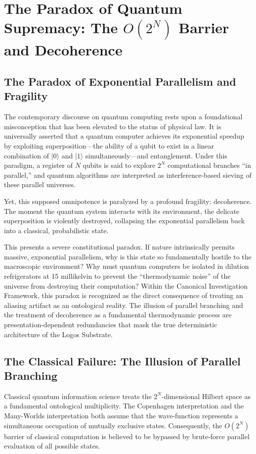 \documentclass[12pt,twoside]{extbook}
\theoremstyle{definition}
\theoremstyle{remark}
\begin{document}
\chapter{The Paradox of Quantum Supremacy: The $O(2^N)$ Barrier and Decoherence}

\section{The Paradox of Exponential Parallelism and Fragility}
The contemporary discourse on quantum computing rests upon a foundational misconception that has been elevated to the status of physical law. It is universally asserted that a quantum computer achieves its exponential speedup by exploiting superposition—the ability of a qubit to exist in a linear combination of $|0\rangle$ and $|1\rangle$ simultaneously—and entanglement. Under this paradigm, a register of $N$ qubits is said to explore $2^N$ computational branches ``in parallel,'' and quantum algorithms are interpreted as interference-based sieving of these parallel universes. 

Yet, this supposed omnipotence is paralyzed by a profound fragility: decoherence. The moment the quantum system interacts with its environment, the delicate superposition is violently destroyed, collapsing the exponential parallelism back into a classical, probabilistic state. 

This presents a severe constitutional paradox. If nature intrinsically permits massive, exponential parallelism, why is this state so fundamentally hostile to the macroscopic environment? Why must quantum computers be isolated in dilution refrigerators at 15 millikelvin to prevent the ``thermodynamic noise'' of the universe from destroying their computation? Within the Canonical Investigation Framework, this paradox is recognized as the direct consequence of treating an aliasing artifact as an ontological reality. The illusion of parallel branching and the treatment of decoherence as a fundamental thermodynamic process are presentation-dependent redundancies that mask the true deterministic architecture of the Logos Substrate.

\section{The Classical Failure: The Illusion of Parallel Branching}
Classical quantum information science treats the $2^N$-dimensional Hilbert space as a fundamental ontological multiplicity. The Copenhagen interpretation and the Many-Worlds interpretation both assume that the wave-function represents a simultaneous occupation of mutually exclusive states. Consequently, the $O(2^N)$ barrier of classical computation is believed to be bypassed by brute-force parallel evaluation of all possible states.
\end{document}
